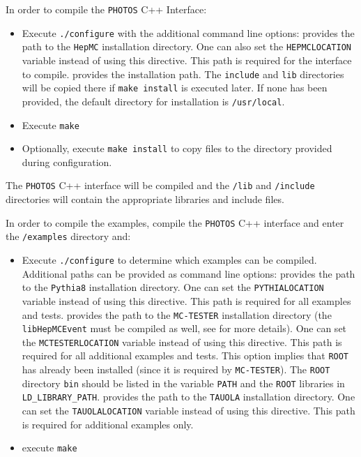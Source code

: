 \documentclass[]{Photos_interface_design}
\begin{document}
In order to compile the {\tt PHOTOS} C++ Interface:
\begin{itemize}
 \item Execute {\tt ./configure} with the additional command line options:
    provides the path to the {\tt HepMC} installation directory. One can also set the {\tt HEPMCLOCATION} variable instead of using this directive. This path is required for the interface to compile.
    provides the installation path. The {\tt include} and {\tt lib} directories will be copied there if {\tt make install} is executed later. If none has been provided, the default directory for installation is {\tt /usr/local}.
 \item Execute {\tt make}
 \item Optionally, execute {\tt make install} to copy files to the directory provided during configuration.
\end{itemize}

The {\tt PHOTOS} C++ interface will be compiled and the {\tt /lib} and {\tt /include} directories will contain the appropriate libraries and include files.

In order to compile the examples, compile the {\tt PHOTOS} C++ interface and enter the {\tt /examples} directory and:
\begin{itemize}
  \item Execute {\tt ./configure} to determine which examples can be compiled.
        Additional paths can be provided as command line options:
    provides the path to the {\tt Pythia8} installation
            directory. One can set the {\tt PYTHIALOCATION} variable instead of using this directive.
            This path is required for all examples and tests.
    provides the path to the {\tt MC-TESTER} installation
            directory (the {\tt libHepMCEvent} must be compiled as well, see \cite{Davidson:2008ma}
			for more details). One can set the {\tt MCTESTERLOCATION} variable instead of using this
			directive. This path is required for all additional examples and tests.  This option
			implies that {\tt ROOT} has already been installed (since it is required by {\tt MC-TESTER}).
			The {\tt ROOT} directory {\tt bin} should be listed in the variable {\tt PATH} and the {\tt ROOT}
			libraries in {\tt LD\_LIBRARY\_PATH}.
    provides the path to the {\tt TAUOLA} installation directory.
            One can set the {\tt TAUOLALOCATION} variable instead of using this directive.
			This path is required for additional examples only.
  \item execute {\tt make}
\end{itemize}
\end{document}
